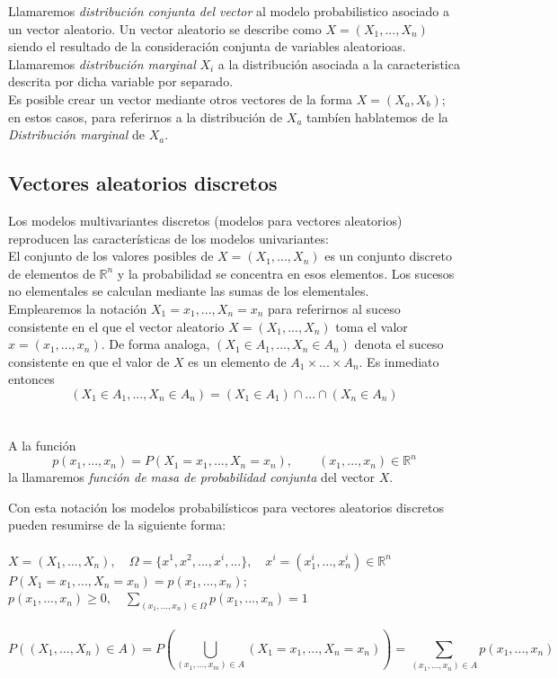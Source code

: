 \documentclass{article}
\begin{document}
Llamaremos \textit{distribución conjunta del vector} al modelo probabilistico asociado a un vector aleatorio.
Un vector aleatorio se describe como \(X = (X_1, ... , X_n)\) siendo el resultado de la consideración conjunta de variables aleatorioas. 
Llamaremos \textit{distribución marginal} \(X_i\) a la distribución asociada a la caracteristica descrita por dicha variable por separado. \\
Es posible crear un vector mediante otros vectores de la forma \(X = (X_a, X_b)\); en estos casos, para referirnos a la distribución de \(X_a\) tambíen hablatemos de la \textit{Distribución marginal} de \(X_a\).

\subsection{Vectores aleatorios discretos}

Los modelos multivariantes discretos (modelos para vectores aleatorios) reproducen las
características de los modelos univariantes: \\
El conjunto de los valores posibles de \(X = (X_1,...,X_n)\) es un conjunto discreto
de elementos de \(\mathbb{R}^n\) y la probabilidad se concentra en esos elementos. Los
sucesos no elementales se calculan mediante las sumas de los elementales. \\
Emplearemos la notación \(X_1 = x_1, ...,  X_n = x_n\) para referirnos al suceso 
consistente en el que el vector aleatorio \(X = (X_1, ...,X_n)\) toma el valor 
\(x = (x_1, ..., x_n)\). De forma analoga, \((X_1 \in A_1, ..., X_n \in A_n)\) denota
el suceso consistente en que el valor de \(X\) es un elemento de \(A_1 \times ... \times A_n\). Es inmediato entonces
\[(X_1 \in A_1, ..., X_n \in A_n) = (X_1 \in A_1) \cap ... \cap (X_n \in A_n)\] \\
\\
A la función 
\[p(x_1, ..., x_n) = P(X_1 = x_1, ..., X_n = x_n), \qquad (x_1, ..., x_n) \in \mathbb{R}^n\]
la llamaremos \textit{función de masa de probabilidad conjunta} del vector \(X\).

\newpage

Con esta notación los modelos probabilísticos para vectores aleatorios discretos pueden
resumirse de la siguiente forma: \\ \\
\(X = (X_1, ..., X_n), \quad \Omega = \{ x^1, x^2, ..., x^i, ... \}, \quad x^i = (x^i_1, ..., x^i_n) \in \mathbb{R}^n\) \\
\(P(X_1 = x_1, ..., X_n = x_n) = p(x_1, ..., x_n);\) \\
\(p(x_1, ..., x_n) \geq 0, \quad \displaystyle\sum_{(x_1, ..., x_n) \in \Omega} p(x_1, ..., x_n) = 1\) \\ \\
\[P((X_1, ..., X_n) \in A) = P\left( \displaystyle\bigcup_{(x_1, ..., x_m) \in A} (X_1 = x_1, ..., X_n = x_n) \right) = \displaystyle\sum_{(x_1, ..., x_n) \in A} p(x_1, ..., x_n)\] \\
\end{document}

